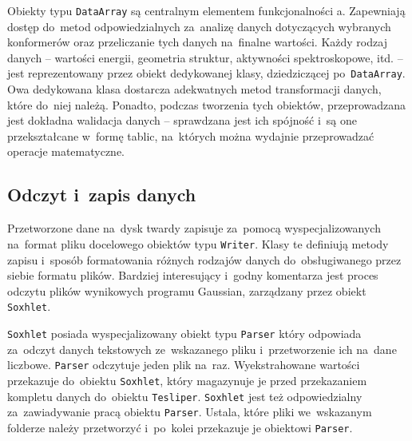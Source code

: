 Obiekty typu \texttt{DataArray} są centralnym elementem funkcjonalności \tesliper{}a.
Zapewniają dostęp do~metod odpowiedzialnych za~analizę danych dotyczących wybranych konformerów
  oraz przeliczanie tych danych na~finalne wartości.
Każdy rodzaj danych \--- wartości energii, geometria struktur, aktywności spektroskopowe, itd.
  \--- jest reprezentowany przez obiekt dedykowanej klasy, dziedziczącej po~\texttt{DataArray}.
Owa dedykowana klasa dostarcza adekwatnych metod transformacji danych, które do~niej należą.
Ponadto, podczas tworzenia tych obiektów, przeprowadzana jest dokładna walidacja danych \---
  sprawdzana jest ich spójność i~są one przekształcane w~formę tablic, na~których można
  wydajnie przeprowadzać operacje matematyczne.

\subsection{Odczyt i~zapis danych}\label{implementation:parsing}
Przetworzone dane na~dysk twardy \tesliper{} zapisuje za~pomocą wyspecjalizowanych na~format
  pliku docelowego obiektów typu \texttt{Writer}.
Klasy te definiują metody zapisu i~sposób formatowania różnych rodzajów danych do~obsługiwanego
  przez siebie formatu plików.
Bardziej interesujący i~godny komentarza jest proces odczytu plików wynikowych programu Gaussian,
  zarządzany przez obiekt \texttt{Soxhlet}.

\texttt{Soxhlet} posiada wyspecjalizowany obiekt typu \texttt{Parser}
  który odpowiada za~odczyt danych tekstowych ze~wskazanego pliku i~przetworzenie ich
  na~dane liczbowe.
\texttt{Parser} odczytuje jeden plik na~raz.
Wyekstrahowane wartości przekazuje do~obiektu \texttt{Soxhlet}, który magazynuje je przed
  przekazaniem kompletu danych do~obiektu \texttt{Tesliper}.
\texttt{Soxhlet} jest też odpowiedzialny za~zawiadywanie pracą obiektu \texttt{Parser}.
Ustala, które pliki we~wskazanym folderze należy przetworzyć i~po~kolei przekazuje je
  obiektowi \texttt{Parser}.

